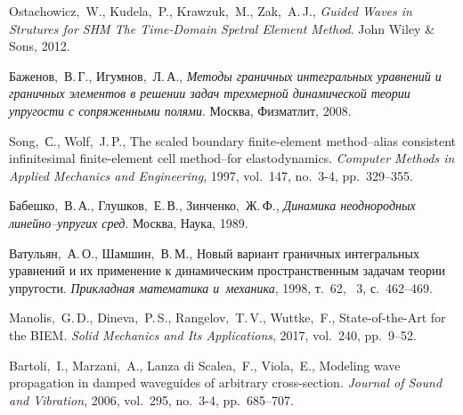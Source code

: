 \documentclass[press]{vestnik}
\begin{document}
\begin{thebibliography}{23}
Ostachowicz,~W., Kudela,~P., Krawzuk,~M., Zak,~A.\,J., \emph{Guided Waves in Strutures for SHM The Time-Domain Spetral Element Method}. John Wiley \& Sons, 2012. 

Баженов,~В.\,Г., Игумнов,~Л.\,А., \emph{Методы граничных интегральных уравнений и граничных элементов в решении задач трехмерной динамической теории упругости с сопряженными полями}. Москва, Физматлит, 2008. 

Song,~С., Wolf,~J.\,P., The scaled boundary finite-element method–alias consistent infinitesimal finite-element cell method–for elastodynamics. \emph{Computer Methods in Applied Mechanics and Engineering}, 1997, vol.~147, no.~3-4, pp.~329--355. 

Бабешко,~В.\,А., Глушков,~Е.\,В., Зинченко,~Ж.\,Ф., \emph{Динамика неоднородных линейно–упругих сред}. Москва, Наука, 1989. 

Ватульян,~А.\,О., Шамшин,~В.\,М., Новый вариант граничных интегральных уравнений и их применение к динамическим пространственным задачам теории упругости. \emph{Прикладная математика и~механика}, 1998, т.~62, \No~3, с.~462--469. 

Manolis,~G.\,D., Dineva,~P.\,S., Rangelov,~T.\,V., Wuttke,~F., State-of-the-Art for the BIEM. \emph{Solid Mechanics and Its Applications}, 2017, vol.~240, pp.~9--52. 

Bartoli,~I., Marzani,~A., Lanza di Scalea,~F., Viola,~E., Modeling wave propagation in damped waveguides of arbitrary cross-section. \emph{Journal of Sound and Vibration}, 2006, vol.~295, no.~3-4, pp.~685--707. 


\end{thebibliography}
\end{document}
